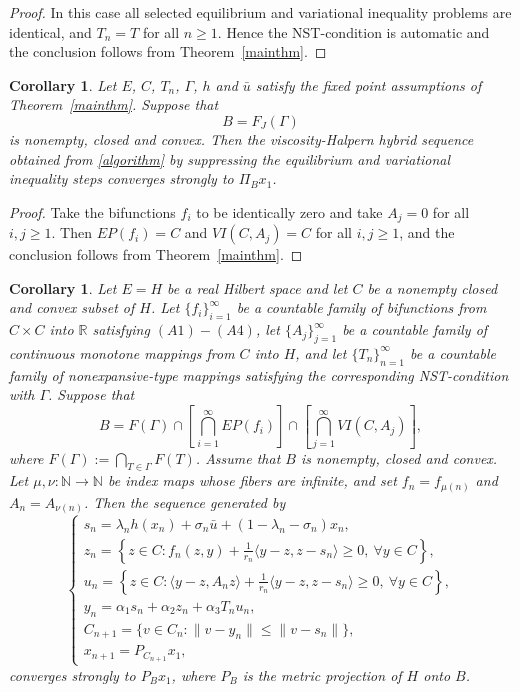 \documentclass[leqno,12pt]{amsart}
\newtheorem{corollary}[theorem]{Corollary}
\theoremstyle{definition}
\numberwithin{equation}{section}
\begin{document}
\begin{proof}
In this case all selected equilibrium and variational inequality problems are identical, and $T_n=T$ for all $n\geq 1$. Hence the NST-condition is automatic and the conclusion follows from Theorem~\ref{mainthm}.
\end{proof}

\begin{corollary}\label{noEPVIcorollary}
Let $E$, $C$, $T_n$, $\Gamma$, $h$ and $\bar u$ satisfy the fixed point assumptions of Theorem~\ref{mainthm}. Suppose that
\[
B=F_J(\Gamma)
\]
is nonempty, closed and convex. Then the viscosity-Halpern hybrid sequence obtained from \eqref{algorithm} by suppressing the equilibrium and variational inequality steps converges strongly to $\Pi_Bx_1$.
\end{corollary}

\begin{proof}
Take the bifunctions $f_i$ to be identically zero and take $A_j=0$ for all $i,j\geq 1$. Then $EP(f_i)=C$ and $VI(C,A_j)=C$ for all $i,j\geq 1$, and the conclusion follows from Theorem~\ref{mainthm}.
\end{proof}

\begin{corollary}\label{hilbertcorollary}
Let $E=H$ be a real Hilbert space and let $C$ be a nonempty closed and convex subset of $H$. Let $\{f_i\}_{i=1}^{\infty}$ be a countable family of bifunctions from $C\times C$ into $\mathbb{R}$ satisfying $(A1)-(A4)$, let $\{A_j\}_{j=1}^{\infty}$ be a countable family of continuous monotone mappings from $C$ into $H$, and let $\{T_n\}_{n=1}^{\infty}$ be a countable family of nonexpansive-type mappings satisfying the corresponding NST-condition with $\Gamma$. Suppose that
\[
B=F(\Gamma)\cap\left[\bigcap_{i=1}^{\infty}EP(f_i)\right]\cap\left[\bigcap_{j=1}^{\infty}VI(C,A_j)\right],
\]
where \(F(\Gamma):=\bigcap_{T\in\Gamma}F(T)\). Assume that \(B\) is nonempty, closed and convex. Let \(\mu,\nu:\mathbb{N}\to\mathbb{N}\) be index maps whose fibers are infinite, and set \(f_n=f_{\mu(n)}\) and \(A_n=A_{\nu(n)}\). Then the sequence generated by
\[
\left\{
\begin{array}{ll}
s_n=\lambda_nh(x_n)+\sigma_n\bar u+(1-\lambda_n-\sigma_n)x_n,\\[1mm]
z_n=\left\{z\in C:f_n(z,y)+\frac{1}{r_n}\langle y-z,z-s_n\rangle\geq 0,\ \forall y\in C\right\},\\[1mm]
u_n=\left\{z\in C:\langle y-z,A_nz\rangle+\frac{1}{r_n}\langle y-z,z-s_n\rangle\geq 0,\ \forall y\in C\right\},\\[1mm]
y_n=\alpha_1s_n+\alpha_2z_n+\alpha_3T_nu_n,\\[1mm]
C_{n+1}=\{v\in C_n:\|v-y_n\|\leq \|v-s_n\|\},\\[1mm]
x_{n+1}=P_{C_{n+1}}x_1,
\end{array}
\right.
\]
converges strongly to $P_Bx_1$, where $P_B$ is the metric projection of $H$ onto $B$.
\end{corollary}
\end{document}
